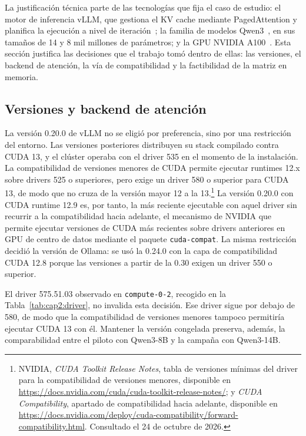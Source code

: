 La justificación técnica parte de las tecnologías que fija el caso de estudio: el motor de inferencia vLLM, que gestiona el KV cache mediante PagedAttention y planifica la ejecución a nivel de iteración~\cite{kwon2023pagedattention}; la familia de modelos Qwen3~\cite{qwen2025qwen3}, en sus tamaños de 14 y 8 mil millones de parámetros; y la GPU NVIDIA A100~\cite{nvidia2021a100}. Esta sección justifica las decisiones que el trabajo tomó dentro de ellas: las versiones, el backend de atención, la vía de compatibilidad y la factibilidad de la matriz en memoria.

\subsection{Versiones y backend de atención}
\label{sec:cap2:versiones}

La versión 0.20.0 de vLLM no se eligió por preferencia, sino por una restricción del entorno. Las versiones posteriores distribuyen su stack compilado contra CUDA 13, y el clúster operaba con el driver 535 en el momento de la instalación. La compatibilidad de versiones menores de CUDA permite ejecutar runtimes 12.x sobre drivers 525 o superiores, pero exige un driver 580 o superior para CUDA 13, de modo que no cruza de la versión mayor 12 a la 13.\footnote{NVIDIA, \textit{CUDA Toolkit Release Notes}, tabla de versiones mínimas del driver para la compatibilidad de versiones menores, disponible en \url{https://docs.nvidia.com/cuda/cuda-toolkit-release-notes/}; y \textit{CUDA Compatibility}, apartado de compatibilidad hacia adelante, disponible en \url{https://docs.nvidia.com/deploy/cuda-compatibility/forward-compatibility.html}. Consultado el 24 de octubre de 2026.} La versión 0.20.0 con CUDA runtime 12.9 es, por tanto, la más reciente ejecutable con aquel driver sin recurrir a la compatibilidad hacia adelante, el mecanismo de NVIDIA que permite ejecutar versiones de CUDA más recientes sobre drivers anteriores en GPU de centro de datos mediante el paquete \texttt{cuda-compat}. La misma restricción decidió la versión de Ollama: se usó la 0.24.0 con la capa de compatibilidad CUDA 12.8 porque las versiones a partir de la 0.30 exigen un driver 550 o superior.

El driver 575.51.03 observado en \texttt{compute-0-2}, recogido en la Tabla~\ref{tab:cap2:driver}, no invalida esta decisión. Ese driver sigue por debajo de 580, de modo que la compatibilidad de versiones menores tampoco permitiría ejecutar CUDA 13 con él. Mantener la versión congelada preserva, además, la comparabilidad entre el piloto con Qwen3-8B y la campaña con Qwen3-14B.

